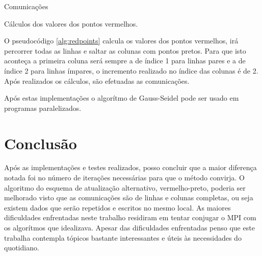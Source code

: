 \documentclass[10pt]{extarticle}
\begin{document}
\begin{algorithm}[H]
 Comunicações\;
 \caption{Cálculos dos valores dos pontos vermelhos.}
 \label{alg:redpoints}
 \end{algorithm}

O pseudocódigo \ref{alg:redpoints} calcula os valores dos pontos vermelhos, irá percorrer todas as linhas e saltar as colunas com pontos pretos. Para que isto aconteça a primeira coluna será sempre a de índice 1 para linhas pares e a de índice 2 para linhas ímpares, o incremento realizado no índice das colunas é de 2. Após realizados os cálculos, são efetuadas as comunicações.

Após estas implementações o algorítmo de Gauss-Seidel pode ser usado em programas paralelizados.

\section{Conclusão}

Após as implementações e testes realizados, posso concluir que a maior diferença notada foi no número de iterações necessárias para que o método convirja. O algoritmo do esquema de atualização alternativo, vermelho-preto, poderia ser melhorado visto que as comunicações são de linhas e colunas completas, ou seja existem dados que serão repetidos e escritos no mesmo local.
As maiores dificuldades enfrentadas neste trabalho residiram em tentar conjugar o MPI com os algorítmos que idealizava. Apesar das dificuldades enfrentadas penso que este trabalha contempla tópicos bastante interessantes e úteis às necessidades do quotidiano.
\end{document}

